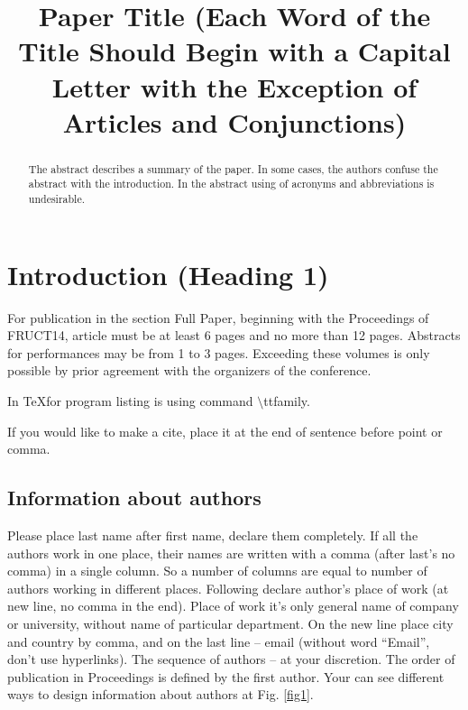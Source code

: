 \documentclass[conference]{IEEEtran}
\begin{document}
\title{Paper Title (Each Word of the Title Should Begin with a Capital Letter with the Exception of Articles and Conjunctions)}
\date{}%

\author{
\and
{}
}
\maketitle

\begin{abstract}
The abstract describes a summary of the paper. In some cases, the authors confuse the abstract with the introduction. In the abstract using of acronyms and abbreviations is undesirable.  
\end{abstract}

\section{Introduction (Heading 1)}
For publication in the section Full Paper, beginning with the Proceedings of FRUCT14, article must be at least 6 pages and no more than 12 pages. Abstracts for performances may be from 1 to 3 pages. Exceeding these volumes is only possible by prior agreement with the organizers of the conference.

In \TeX for program listing is using command $\setminus$\ttfamily ttfamily.

\rmfamily
If you would like to make a cite, place it at the end of sentence before point or comma.

\subsection{Information about authors}
Please place last name after first name, declare them completely. If all the authors work in one place, their names are written with a comma (after last's no comma) in a single column. So a number of columns are equal to number of authors working in different places. Following declare author's place of work (at new line, no comma in the end). Place of work it's only general name of company or university, without name of particular department. On the new line place city and country by comma, and on the last line -- email (without word ``Email'', don't use hyperlinks). The sequence of authors -- at your discretion. The order of publication in Proceedings is defined by the first author. Your can see different ways to design information about authors at Fig. \ref{fig1}.
\end{document}
